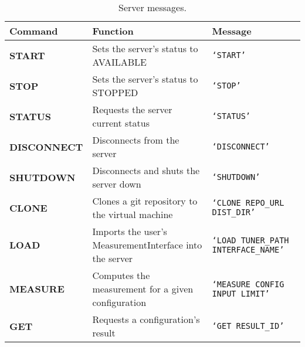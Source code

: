 \newcommand{\specialcell}[2][c]{%
  \begin{tabular}[#1]{@{}K@{}}#2\end{tabular}}


\begin{table}[htpb]
    \centering
    \tiny
    \begin{tabular}{@{}TLK@{}}
        \toprule
        {\bf Command} & {\bf Function} & {\bf Message} \\ \midrule
        {\tiny \bf START} &
        {\tiny Sets the server's status to AVAILABLE} &
        {\tiny \tt \lq{}START\rq{}} \\ \midrule
        {\tiny \bf STOP} &
        {\tiny Sets the server's status to STOPPED} &
        {\tiny \tt \lq{}STOP\rq{}} \\ \midrule
        {\tiny \bf STATUS} &
        {\tiny Requests the server current status} &
        {\tiny \tt \lq{}STATUS\rq{}} \\ \midrule
        {\tiny \bf DISCONNECT} &
        {\tiny Disconnects from the server} &
        {\tiny \tt \lq{}DISCONNECT\rq{}} \\ \midrule
        {\tiny \bf SHUTDOWN} &
        {\tiny Disconnects and shuts the server down} &
        {\tiny \tt \lq{}SHUTDOWN\rq{}} \\ \midrule
        {\tiny \bf CLONE} &
        {\tiny Clones a git repository to the virtual machine} &
        {\tiny \tt \lq{}CLONE REPO\_URL DIST\_DIR\rq{}} \\ \midrule
        {\tiny \bf LOAD} &
        {\tiny Imports the user's MeasurementInterface into the server} &
        {\tiny \tt \lq{}LOAD TUNER\_PATH INTERFACE\_NAME\rq{}} \\ \midrule
        {\tiny \bf MEASURE} &
        {\tiny Computes the measurement for a given configuration} &
        {\tiny \tt \lq{}MEASURE CONFIG INPUT LIMIT\rq{}} \\ \midrule
        {\tiny \bf GET} &
        {\tiny Requests a configuration's result} &
        {\tiny \tt \lq{}GET RESULT\_ID\rq{}} \\ \bottomrule
    \end{tabular}
    \caption{Server messages.}
    \label{tab:protocol-messages}
\end{table}
